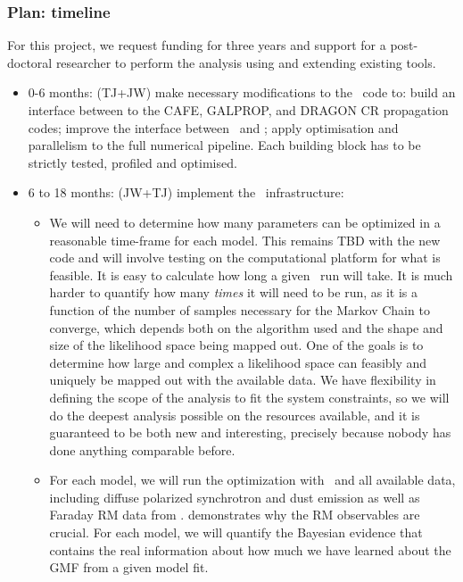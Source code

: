 \subsubsection*{Plan:  timeline}\label{sec:outline}

For this project, we request funding for three years and support for
a post-doctoral researcher to perform the analysis using
and extending existing tools. 

\begin{itemize}

\item 0-6 months: (TJ+JW) make necessary modifications to the \hammurabi\ code to:   build an interface between to the CAFE, GALPROP, and DRAGON CR propagation codes;  improve the interface between \imagineSW\ and \hammurabi;  apply optimisation and parallelism to the full numerical pipeline. 
Each building block has to be strictly tested, profiled and optimised.

\item 6 to 18 months: (JW+TJ) implement the \imagineSW\
  infrastructure:   

\begin{itemize}


\item We will need to determine how many parameters can be
  optimized in a reasonable time-frame for each model.  This remains
  TBD with the new code and will involve testing on the computational
  platform for what is feasible. It is easy to calculate how long a
  given \hammurabi\ run will take. It is much harder to quantify how
  many {\it times} it will need to be run, as it is a function of the
  number of samples necessary for the Markov Chain to converge, which depends
  both on the algorithm used and the shape and size of the likelihood
  space being mapped out. One of the goals is to determine how large and complex a likelihood space can feasibly and uniquely be mapped out with the available data. We have flexibility in defining the scope of
  the analysis to fit the system constraints, so we will do the deepest analysis possible on the resources available, and
  it is guaranteed to be both new and interesting, precisely because
  nobody has done anything comparable before.

\item For each model, we will run the optimization with \imagineSW\ and all
  available data, including diffuse polarized synchrotron and dust emission as well as 
  Faraday RM data from
  \citet{oppermann:2012b}. \citealt{jaffe10} demonstrates why the
  RM observables are crucial.  For each model, we will quantify the Bayesian evidence that
  contains the real information about how much we have learned about
  the GMF from a given model fit. 



\end{itemize}
\end{itemize}

